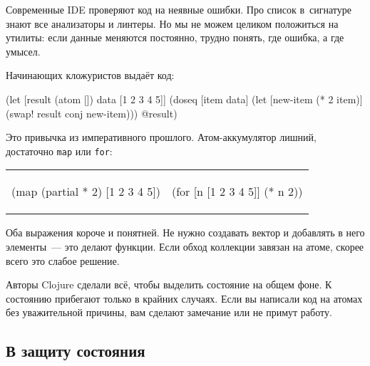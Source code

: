 Современные IDE проверяют код на неявные ошибки. Про список в~сигнатуре знают
все анализаторы и линтеры. Но мы не можем целиком положиться на утилиты: если
данные меняются постоянно, трудно понять, где ошибка, а где умысел.

Начинающих кложуристов выдаёт код:

\begin{english}
  \begin{clojure}
(let [result (atom [])
      data [1 2 3 4 5]]
  (doseq [item data]
    (let [new-item (* 2 item)]
      (swap! result conj new-item)))
  @result)
  \end{clojure}
\end{english}


\noindent
Это привычка из императивного прошлого. Атом-аккумулятор лишний, достаточно
\verb|map| или \verb|for|:


\noindent
\begin{tabular}{ @{}p{5cm} @{}p{5cm} }

\begin{english}
  \begin{clojure}
(map (partial * 2)
     [1 2 3 4 5])
  \end{clojure}
\end{english}

&

\begin{english}
  \begin{clojure}
(for [n [1 2 3 4 5]]
  (* n 2))
  \end{clojure}
\end{english}

\end{tabular}

Оба выражения короче и понятней. Не нужно создавать вектор и добавлять в него
элементы~--- это делают функции. Если обход коллекции завязан на
атоме, скорее всего это слабое решение.

Авторы Clojure сделали всё, чтобы выделить состояние на общем фоне. К
состоянию прибегают только в крайних случаях. Если вы написали код на атомах без
уважительной причины, вам сделают замечание или не примут работу.


\subsection{В защиту состояния}

